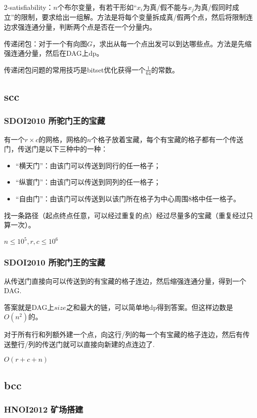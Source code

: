 \documentclass[10pt]{beamer}
\begin{document}
\begin{CJK}{UTF8}{gkai}
\begin{spacing}{1.1}
\begin{frame}
	2-satisfiability：$n$个布尔变量，有若干形如“$x_i$为真/假不能与$x_j$为真/假同时成立”的限制，要求给出一组解。方法是将每个变量拆成真/假两个点，然后将限制连边求强连通分量，判断两个点是否在一个分量内。\pause

	传递闭包：对于一个有向图$G$，求出从每一个点出发可以到达哪些点。方法是先缩强连通分量，然后在DAG上dp。
	
	传递闭包问题的常用技巧是bitset优化获得一个$\frac1{64}$的常数。

\end{frame}

\subsection{scc}

\begin{frame}
\frametitle{SDOI2010 所驼门王的宝藏}

	有一个$r \times c$的网格，网格的$n$个格子放着宝藏，每个有宝藏的格子都有一个传送门，传送门是以下三种中的一种：

	\begin{itemize}
		\item “横天门”：由该门可以传送到同行的任一格子；
		\item “纵寰门”：由该门可以传送到同列的任一格子；
		\item “自由门”：由该门可以传送到以该门所在格子为中心周围8格中任一格子。
	\end{itemize}

	找一条路径（起点终点任意，可以经过重复的点）经过尽量多的宝藏（重复经过只算一次）。

	$n \le 10^5, r, c \le 10^6$

\end{frame}

\begin{frame}
\frametitle{SDOI2010 所驼门王的宝藏}

	从传送门直接向可以传送到的有宝藏的格子连边，然后缩强连通分量，得到一个DAG. \pause
	
	答案就是DAG上$size$之和最大的链，可以简单地dp得到答案。但这样边数是$O(n^2)$的。\pause

	对于所有行和列额外建一个点，向这行/列的每一个有宝藏的格子连边，然后有传送整行/列的传送门就可以直接向新建的点连边了.

	$O(r + c + n)$
\end{frame}

\subsection{bcc}
\begin{frame}
\frametitle{HNOI2012 矿场搭建}
	

\end{frame}
\end{spacing}
\end{CJK}
\end{document}
